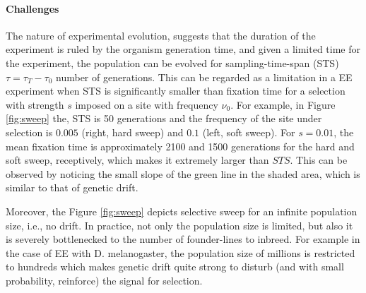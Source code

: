 \documentclass[11pt]{article}
\begin{document}
\paragraph{Challenges}
The nature of experimental evolution, suggests that the duration of the 
experiment is ruled by the organism generation time, and given a limited time 
for the experiment, the population can be evolved for sampling-time-span (STS) 
$\tau=\tau_T-\tau_0$  number of generations. This can be regarded as a 
limitation in a EE experiment when STS is significantly smaller than fixation 
time for a selection with strength $s$ imposed on a site with frequency 
$\nu_0$. For example, in Figure \ref{fig:sweep} the, STS is 50 generations and 
the frequency of the site under selection is $0.005$ (right, hard sweep) and 
$0.1$ (left, soft sweep). 
For $s=0.01$, the mean fixation time is approximately 2100 and 1500 generations 
for the hard and soft sweep, receptively, which makes it extremely larger than 
$STS$. This can be observed by noticing the small slope of the green line in 
the shaded area, which is similar to that of genetic drift.

Moreover, the Figure \ref{fig:sweep} depicts selective sweep for an infinite 
population size, i.e., no drift. In practice, not only the population size is 
limited, but also it is severely bottlenecked to the number of founder-lines to 
inbreed. For example in the case of EE with D. melanogaster, the population 
size of millions is restricted to hundreds which makes genetic drift quite 
strong to disturb (and with small probability, reinforce) the signal for 
selection.
\end{document}
